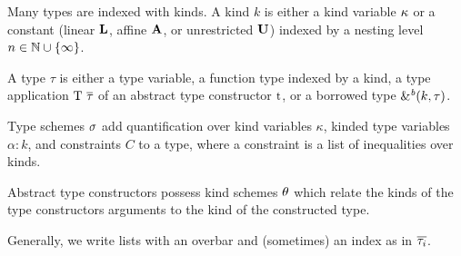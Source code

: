Many types are indexed with kinds.
A kind $k$ is either a kind variable $\kvar$ or a constant
(linear $\klin$, affine $\kaff$, or unrestricted $\kun$) indexed
by a nesting level $n \in \Nat \cup \{\infty\}$.

A type $\tau$ is either a type variable, a function type indexed by a
kind,
a type application $\tapp{\tcon}{\Multi{\tau}}$ of an abstract type constructor
$\T t$, or a borrowed type  $\borrowty{k}{\tau}$.

Type schemes $\schm$ add quantification over kind
variables $\kappa$, kinded type variables $\alpha:k$, and constraints
$C$ to a type, where a constraint is a list of inequalities over
kinds.

Abstract type constructors possess kind schemes $\kschm$ which relate
the kinds of the type constructors arguments to the kind of the
constructed type.

Generally, we write lists with an overbar and (sometimes) an index as
in $\Multi[i]\tau$.





